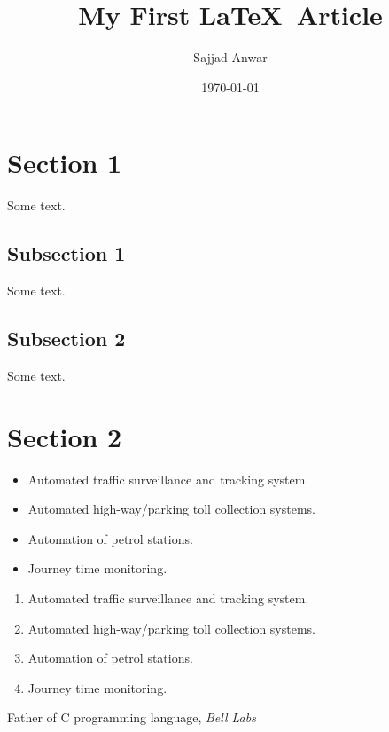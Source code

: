 \documentclass{article}
\title{My First \LaTeX\ Article}
\author{Sajjad Anwar}
\date{\today}
\begin{document}
\maketitle
\newpage
\tableofcontents
\newpage
\section{Section 1}
Some text.
\subsection{Subsection 1}
Some text.\cite{dennis}
\subsection*{Subsection 2}
Some text.
\section{Section 2}

\begin{itemize}
 \item Automated traffic surveillance and tracking system.
 \item Automated high-way/parking toll collection systems.
 \item Automation of petrol stations.
 \item Journey time monitoring.
\end{itemize}


\begin{enumerate}
 \item Automated traffic surveillance and tracking system.
 \item Automated high-way/parking toll collection systems.
 \item Automation of petrol stations.
 \item Journey time monitoring.
\end{enumerate}

\newpage
\begin{thebibliography}{Dennis, 1993}
Father of C programming language,
\emph{Bell Labs}
\end{thebibliography}
\end{document}
